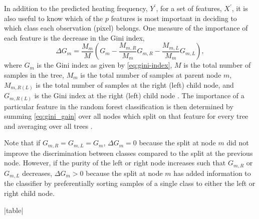 In addition to the predicted heating frequency, $Y^\prime$, for a set of features, $X^\prime$, it is also useful to know which of the $p$ features is most important in deciding to which class each observation (pixel) belongs. One measure of the importance of each feature is the decrease in the Gini index,
\begin{equation}\label{eq:gini_gain}
    \Delta G_m = \frac{M_m}{M}\left( G_m - \frac{M_{m,R}}{M_m}G_{m,R} - \frac{M_{m,L}}{M_m}G_{m,L} \right),
\end{equation}
where $G_m$ is the Gini index as given by \autoref{eq:gini-index}, $M$ is the total number of samples in the tree, $M_m$ is the total number of samples at parent node $m$, $M_{m,R(L)}$ is the total number of samples at the right (left) child node, and $G_{m,R(L)}$ is the Gini index at the right (left) child node \citep{sandri_bias_2008}. The importance of a particular feature in the random forest classification is then determined by summing \autoref{eq:gini_gain} over all nodes which split on that feature for every tree and averaging over all trees \citep{breiman_classification_1984}.

Note that if $G_{m,R}=G_{m,L}=G_m$, $\Delta G_m=0$ because the split at node $m$ did not improve the discrimination between classes compared to the split at the previous node. However, if the purity of the left or right node increases such that $G_{m,R}$ or $G_{m,L}$ decreases, $\Delta G_m > 0$ because the split at node $m$ has added information to the classifier by preferentially sorting samples of a single class to either the left or right child node.

\py[manager_ml]|table|

